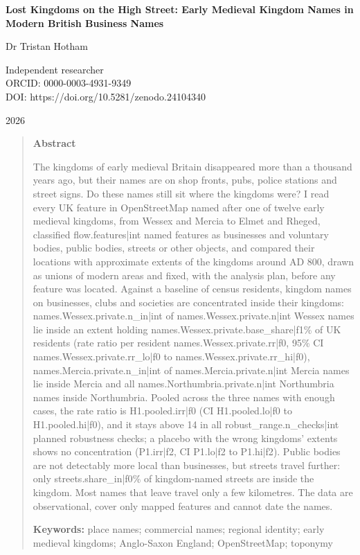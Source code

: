 \documentclass[11pt,a4paper]{article}
\begin{document}
\begin{center}
{\Large\bfseries Lost Kingdoms on the High Street: Early Medieval Kingdom Names in Modern British Business Names\par}
\vspace{1.2em}
{\large Dr Tristan Hotham\par}
\vspace{0.3em}
{\small Independent researcher\\
ORCID: 0000-0003-4931-9349\\
DOI: https://doi.org/10.5281/zenodo.24104340\par}
\vspace{0.8em}
2026
\end{center}

\begin{quote}
\small
\begin{center}\textbf{Abstract}\end{center}
The kingdoms of early medieval Britain disappeared more than a thousand years ago, but their names are on shop fronts, pubs, police stations and street signs. Do these names still sit where the kingdoms were? I read every UK feature in OpenStreetMap named after one of twelve early medieval kingdoms, from Wessex and Mercia to Elmet and Rheged, classified {{flow.features|int}} named features as businesses and voluntary bodies, public bodies, streets or other objects, and compared their locations with approximate extents of the kingdoms around AD 800, drawn as unions of modern areas and fixed, with the analysis plan, before any feature was located. Against a baseline of census residents, kingdom names on businesses, clubs and societies are concentrated inside their kingdoms: {{names.Wessex.private.n_in|int}} of {{names.Wessex.private.n|int}} Wessex names lie inside an extent holding {{names.Wessex.private.base_share|f1}}\% of UK residents (rate ratio per resident {{names.Wessex.private.rr|f0}}, 95\% CI {{names.Wessex.private.rr_lo|f0}} to {{names.Wessex.private.rr_hi|f0}}), {{names.Mercia.private.n_in|int}} of {{names.Mercia.private.n|int}} Mercia names lie inside Mercia and all {{names.Northumbria.private.n|int}} Northumbria names inside Northumbria. Pooled across the three names with enough cases, the rate ratio is {{H1.pooled.irr|f0}} (CI {{H1.pooled.lo|f0}} to {{H1.pooled.hi|f0}}), and it stays above 14 in all {{robust_range.n_checks|int}} planned robustness checks; a placebo with the wrong kingdoms' extents shows no concentration ({{P1.irr|f2}}, CI {{P1.lo|f2}} to {{P1.hi|f2}}). Public bodies are not detectably more local than businesses, but streets travel further: only {{streets.share_in|f0}}\% of kingdom-named streets are inside the kingdom. Most names that leave travel only a few kilometres. The data are observational, cover only mapped features and cannot date the names.

\textbf{Keywords:} place names; commercial names; regional identity; early medieval kingdoms; Anglo-Saxon England; OpenStreetMap; toponymy
\end{quote}
\end{document}
